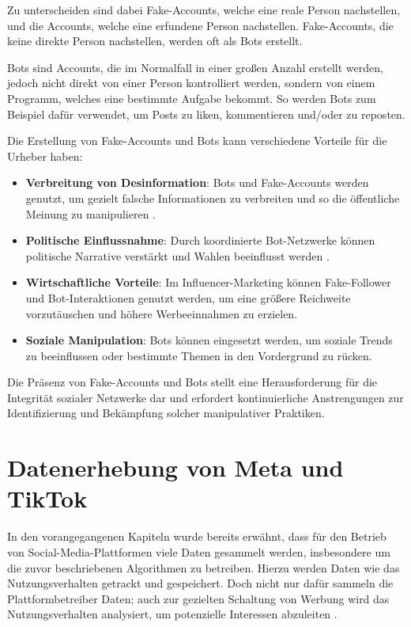 \documentclass[12pt]{report}
\begin{document}
Zu unterscheiden sind dabei Fake-Accounts, welche eine reale Person nachstellen, und die Accounts, welche eine erfundene Person nachstellen. Fake-Accounts, die keine direkte Person nachstellen, werden oft als Bots erstellt.

Bots sind Accounts, die im Normalfall in einer großen Anzahl erstellt werden, jedoch nicht direkt von einer Person kontrolliert werden, sondern von einem Programm, welches eine bestimmte Aufgabe bekommt. So werden Bots zum Beispiel dafür verwendet, um Posts zu liken, kommentieren und/oder zu reposten.  

Die Erstellung von Fake-Accounts und Bots kann verschiedene Vorteile für die Urheber haben:

\begin{itemize}
	\item \textbf{Verbreitung von Desinformation}: Bots und Fake-Accounts werden genutzt, um gezielt falsche Informationen zu verbreiten und so die öffentliche Meinung zu manipulieren \cite{akhtar2023false}.
	\item \textbf{Politische Einflussnahme}: Durch koordinierte Bot-Netzwerke können politische Narrative verstärkt und Wahlen beeinflusst werden \cite{reuters2025merz}.
	\item \textbf{Wirtschaftliche Vorteile}: Im Influencer-Marketing können Fake-Follower und Bot-Interaktionen genutzt werden, um eine größere Reichweite vorzutäuschen und höhere Werbeeinnahmen zu erzielen.
	\item \textbf{Soziale Manipulation}: Bots können eingesetzt werden, um soziale Trends zu beeinflussen oder bestimmte Themen in den Vordergrund zu rücken.
\end{itemize}

Die Präsenz von Fake-Accounts und Bots stellt eine Herausforderung für die Integrität sozialer Netzwerke dar und erfordert kontinuierliche Anstrengungen zur Identifizierung und Bekämpfung solcher manipulativer Praktiken.


\section{Datenerhebung von Meta und TikTok}

In den vorangegangenen Kapiteln wurde bereits erwähnt, dass für den Betrieb von Social-Media-Plattformen viele Daten gesammelt werden, insbesondere um die zuvor beschriebenen Algorithmen zu betreiben. Hierzu werden Daten wie das Nutzungsverhalten getrackt und gespeichert. Doch nicht nur dafür sammeln die Plattformbetreiber Daten; auch zur gezielten Schaltung von Werbung wird das Nutzungsverhalten analysiert, um potenzielle Interessen abzuleiten \cite{zdnet2020}.
\end{document}
